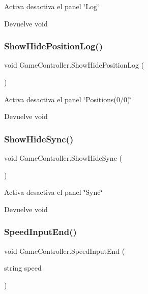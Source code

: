 Activa desactiva el panel \char`\"{}\+Log\char`\"{} \begin{DoxyReturn}{Devuelve}
void 
\end{DoxyReturn}
\mbox{\label{class_game_controller_a4115faf1339706f462166c1f82d9ec8c}} 
\subsubsection{\texorpdfstring{ShowHidePositionLog()}{ShowHidePositionLog()}}
{\footnotesize\ttfamily void Game\+Controller.\+Show\+Hide\+Position\+Log (\begin{DoxyParamCaption}{ }\end{DoxyParamCaption})\hspace{0.3cm}{\ttfamily [inline]}}

Activa desactiva el panel \char`\"{}\+Positions(0/0)\char`\"{} \begin{DoxyReturn}{Devuelve}
void 
\end{DoxyReturn}
\mbox{\label{class_game_controller_a0c878163f61d0c5f249f06076eb4414b}} 
\subsubsection{\texorpdfstring{ShowHideSync()}{ShowHideSync()}}
{\footnotesize\ttfamily void Game\+Controller.\+Show\+Hide\+Sync (\begin{DoxyParamCaption}{ }\end{DoxyParamCaption})\hspace{0.3cm}{\ttfamily [inline]}}

Activa desactiva el panel \char`\"{}\+Sync\char`\"{} \begin{DoxyReturn}{Devuelve}
void 
\end{DoxyReturn}
\mbox{\label{class_game_controller_a7a993b5ee6e6376f81670d3958d48bb6}} 
\subsubsection{\texorpdfstring{SpeedInputEnd()}{SpeedInputEnd()}}
{\footnotesize\ttfamily void Game\+Controller.\+Speed\+Input\+End (\begin{DoxyParamCaption}\item[{string}]{speed }\end{DoxyParamCaption})\hspace{0.3cm}{\ttfamily [inline]}}

